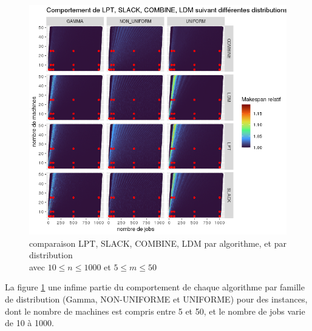 \documentclass[a4paper,12pt]{report}
\theoremstyle{plain}				%
\theoremstyle{definition}				%
\begin{document}
\begin{figure}
{\centering
\includegraphics[width=\columnwidth]{9_resultatComparaisonAlgoDistributions.png}
\caption{comparaison LPT, SLACK, COMBINE, LDM par algorithme, et par distribution\\
\hspace{\linewidth} avec $10\leq n \leq 1000$ et $5\leq m \leq 50$}
\label{fig:resultatComparaisonAlgoDistributions}
\par}
\end{figure}

La figure \ref{fig:resultatComparaisonAlgoDistributions} une infime partie 
  du comportement de chaque algorithme par famille de distribution 
  (Gamma, NON-UNIFORME et UNIFORME) 
  pour des instances, dont le nombre de machines est compris entre 5 et 50, 
  et le nombre de jobs varie de 10 à 1000. 
\end{document}
